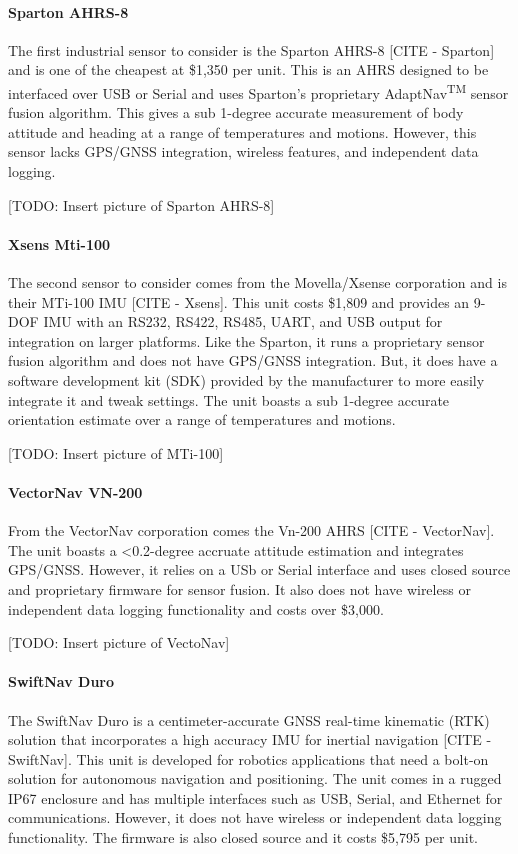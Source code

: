 \paragraph*{Sparton AHRS-8} The first industrial sensor to consider is the Sparton AHRS-8 [CITE - Sparton] and is one of the cheapest at \$1,350 per unit.
This is an AHRS designed to be interfaced over USB or Serial and uses Sparton's proprietary AdaptNav\textsuperscript{TM} sensor fusion algorithm.
This gives a sub 1-degree accurate measurement of body attitude and heading at a range of temperatures and motions.
However, this sensor lacks GPS/GNSS integration, wireless features, and independent data logging.

[TODO: Insert picture of Sparton AHRS-8]

\paragraph*{Xsens Mti-100} The second sensor to consider comes from the Movella/Xsense corporation and is their MTi-100 IMU [CITE - Xsens].
This unit costs \$1,809 and provides an 9-DOF IMU with an RS232, RS422, RS485, UART, and USB output for integration on larger platforms.
Like the Sparton, it runs a proprietary sensor fusion algorithm and does not have GPS/GNSS integration.
But, it does have a software development kit (SDK) provided by the manufacturer to more easily integrate it and tweak settings.
The unit boasts a sub 1-degree accurate orientation estimate over a range of temperatures and motions.

[TODO: Insert picture of MTi-100]

\paragraph*{VectorNav VN-200} From the VectorNav corporation comes the Vn-200 AHRS [CITE - VectorNav].
The unit boasts a \textless 0.2-degree accruate attitude estimation and integrates GPS/GNSS.
However, it relies on a USb or Serial interface and uses closed source and proprietary firmware for sensor fusion.
It also does not have wireless or independent data logging functionality and costs over \$3,000.

[TODO: Insert picture of VectoNav]

\paragraph*{SwiftNav Duro} The SwiftNav Duro is a centimeter-accurate GNSS real-time kinematic (RTK) solution that incorporates a high accuracy IMU for inertial navigation [CITE - SwiftNav].
This unit is developed for robotics applications that need a bolt-on solution for autonomous navigation and positioning.
The unit comes in a rugged IP67 enclosure and has multiple interfaces such as USB, Serial, and Ethernet for communications.
However, it does not have wireless or independent data logging functionality.
The firmware is also closed source and it costs \$5,795 per unit.

